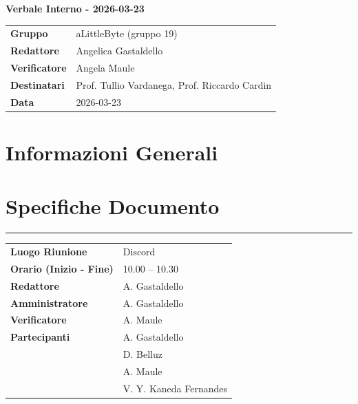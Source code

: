 \documentclass[a4paper,12pt]{article}
\begin{document}
\thispagestyle{firstpage}

\vspace*{0.5cm}

\begin{center}
    {\LARGE \textbf{Verbale Interno - 2026-03-23}}
\end{center}

\vspace{1.5cm}

\begin{center}
    \renewcommand{\arraystretch}{1.3}
    \begin{tcolorbox}[
        width=0.92\textwidth,
        colback=gray!6,
        colframe=gray!45,
        boxrule=0.5pt,
        arc=2mm,
        boxsep=0pt,
        left=8pt, right=8pt, top=8pt, bottom=8pt
    ]
        \begin{tabularx}{\linewidth}{>{\bfseries}p{3.5cm} X}
            Gruppo      & aLittleByte (gruppo 19) \\
            Redattore   & Angelica Gastaldello \\
            Verificatore& Angela Maule\\
            Destinatari & Prof. Tullio Vardanega, Prof. Riccardo Cardin \\
            Data        &  2026-03-23\\
        \end{tabularx}
    \end{tcolorbox}
\end{center}

\newpage

\tableofcontents
\newpage

\section{Informazioni Generali}
\section*{Specifiche Documento}
\hrule
\vspace{1cm}

\begin{tabular}{>{\bfseries}p{5cm} | p{10cm}}
Luogo Riunione & Discord \\[6pt]

Orario (Inizio - Fine) & 10.00 -- 10.30 \\[6pt]

Redattore &
  A. Gastaldello\\[6pt]

Amministratore & 
A. Gastaldello\\[6pt]

Verificatore &
A. Maule\\[6pt]

Partecipanti &
A. Gastaldello\\&
  D. Belluz\\&
  A. Maule\\&
    V. Y. Kaneda Fernandes\\
 [6pt]
  
\end{tabular}
\end{document}
